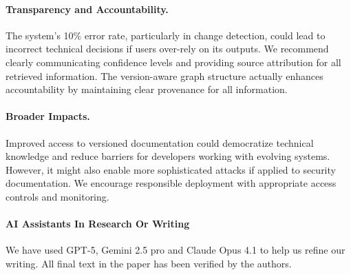 \documentclass[11pt]{article}
\begin{document}
\paragraph{Transparency and Accountability.}
The system's 10\% error rate, particularly in change detection, could lead to incorrect technical decisions if users over-rely on its outputs. We recommend clearly communicating confidence levels and providing source attribution for all retrieved information. The version-aware graph structure actually enhances accountability by maintaining clear provenance for all information.

\paragraph{Broader Impacts.}
Improved access to versioned documentation could democratize technical knowledge and reduce barriers for developers working with evolving systems. However, it might also enable more sophisticated attacks if applied to security documentation. We encourage responsible deployment with appropriate access controls and monitoring.


\paragraph{AI Assistants In Research Or Writing}
We have used GPT-5, Gemini 2.5 pro and Claude Opus 4.1 to help us refine our writing. All final text in the paper has been verified by the authors.



\appendix
\onecolumn

\end{document}
